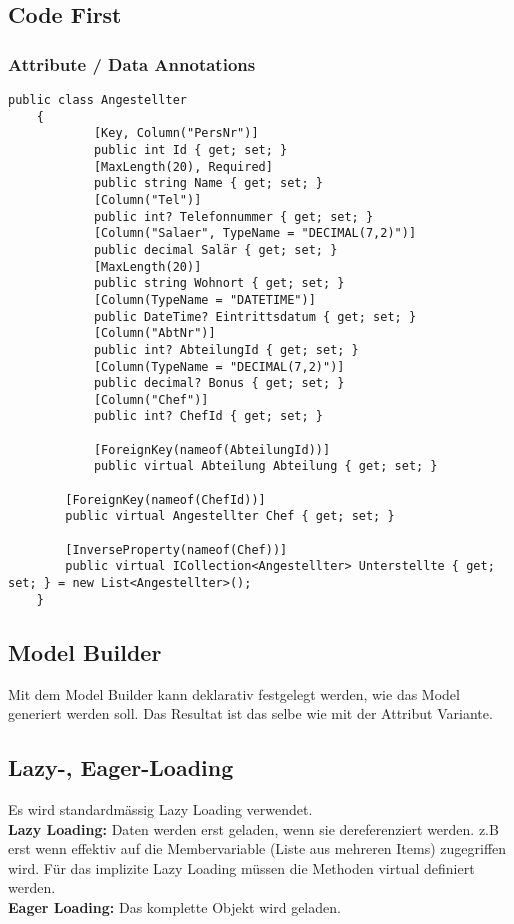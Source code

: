 \subsection{Code First}
\subsubsection{Attribute / Data Annotations}
\begin{lstlisting}
public class Angestellter
	{
            [Key, Column("PersNr")]
            public int Id { get; set; }
            [MaxLength(20), Required]
            public string Name { get; set; }
            [Column("Tel")]
            public int? Telefonnummer { get; set; }
            [Column("Salaer", TypeName = "DECIMAL(7,2)")]
            public decimal Salär { get; set; }
            [MaxLength(20)]
            public string Wohnort { get; set; }
            [Column(TypeName = "DATETIME")]
            public DateTime? Eintrittsdatum { get; set; }
            [Column("AbtNr")]
            public int? AbteilungId { get; set; }
            [Column(TypeName = "DECIMAL(7,2)")]
            public decimal? Bonus { get; set; }
            [Column("Chef")]
            public int? ChefId { get; set; }

            [ForeignKey(nameof(AbteilungId))]
            public virtual Abteilung Abteilung { get; set; }

        [ForeignKey(nameof(ChefId))]
        public virtual Angestellter Chef { get; set; }

        [InverseProperty(nameof(Chef))]
        public virtual ICollection<Angestellter> Unterstellte { get; set; } = new List<Angestellter>();
	} 
\end{lstlisting}

\subsection{Model Builder}
Mit dem Model Builder kann deklarativ festgelegt werden, wie das Model generiert werden soll. Das Resultat ist das selbe wie mit der Attribut Variante.

\subsection{Lazy-, Eager-Loading}
Es wird standardmässig Lazy Loading verwendet. \\
\textbf{Lazy Loading:} Daten werden erst geladen, wenn sie dereferenziert werden. z.B erst wenn effektiv auf die Membervariable (Liste aus mehreren Items) zugegriffen wird. Für das implizite Lazy Loading müssen die Methoden virtual definiert werden. \\
\textbf{Eager Loading:} Das komplette Objekt wird geladen.

